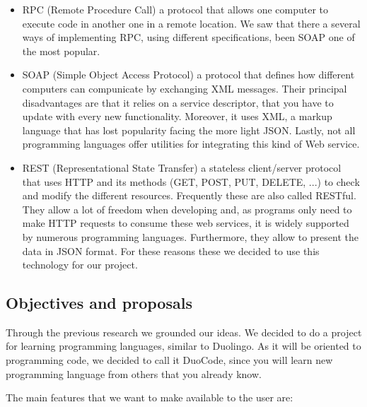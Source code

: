\begin{itemize}
\item
RPC (Remote Procedure Call) a protocol that allows one computer to execute code in another one in a remote location. We saw that there a several ways of implementing RPC, using different specifications, been SOAP one of the most popular.

\item
SOAP (Simple Object Access Protocol) a protocol that defines how different computers can compunicate by exchanging XML messages. Their principal disadvantages are that it relies on a service descriptor, that you have to update with every new functionality. Moreover, it uses XML, a markup language that has lost popularity facing the more light JSON. Lastly, not all programming languages offer utilities for integrating this kind of Web service.

\item
REST (Representational State Transfer) a stateless client/server protocol that uses HTTP and its methods (GET, POST, PUT, DELETE, ...) to check and modify the different resources. Frequently these are also called RESTful. They allow a lot of freedom when developing and, as programs only need to make HTTP requests to consume these web services, it is widely supported by numerous programming languages. Furthermore, they allow to present the data in JSON format. For these reasons these we decided to use this technology for our project.

\end{itemize}

\subsection{Objectives and proposals\label{subsec:proposals}}

Through the previous research we grounded our ideas. We decided to do a project for learning programming languages, similar to Duolingo. As it will be oriented to programming code, we decided to call it DuoCode, since you will learn new programming language from others that you already know.

The main features that we want to make available  to the user are:

